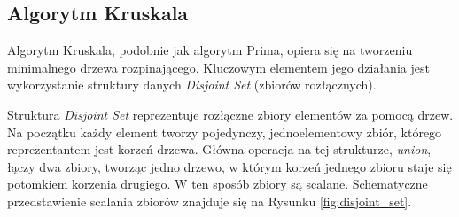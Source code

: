 \subsection{Algorytm Kruskala}

Algorytm Kruskala, podobnie jak algorytm Prima, opiera się na tworzeniu minimalnego drzewa rozpinającego. Kluczowym elementem jego działania jest wykorzystanie struktury danych \textit{Disjoint Set} (zbiorów rozłącznych).

Struktura \textit{Disjoint Set} reprezentuje rozłączne zbiory elementów za pomocą drzew. Na początku każdy element tworzy pojedynczy, jednoelementowy zbiór, którego reprezentantem jest korzeń drzewa. Główna operacja na tej strukturze, \textit{union}, łączy dwa zbiory, tworząc jedno drzewo, w którym korzeń jednego zbioru staje się potomkiem korzenia drugiego. W ten sposób zbiory są scalane. Schematyczne przedstawienie scalania zbiorów znajduje się na Rysunku \ref{fig:disjoint_set}.



